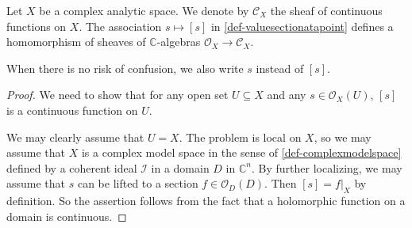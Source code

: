 \begin{lemma}
    Let $X$ be a complex analytic space. We denote by $\mathcal{C}_X$ the sheaf of continuous functions on $X$. 
    The association $s\mapsto [s]$ in \cref{def-valuesectionatapoint} defines a homomorphism of sheaves of $\mathbb{C}$-algebras $\mathcal{O}_X\rightarrow \mathcal{C}_X$. 
\end{lemma}
When there is no risk of confusion, we also write $s$ instead of $[s]$.
\begin{proof}
    We need to show that for any open set $U\subseteq X$ and any $s\in \mathcal{O}_X(U)$, $[s]$ is a continuous function on $U$. 
    
    We may clearly assume that $U=X$. The problem is local on $X$, so we may assume that $X$ is a complex model space in the sense of \cref{def-complexmodelspace} defined by a coherent ideal $\mathcal{I}$ in a domain $D$ in $\mathbb{C}^n$. By further localizing, we may assume that $s$ can be lifted to a section $f\in\mathcal{O}_D(D)$. Then $[s]=f|_X$ by definition. So the assertion follows from the fact that a holomorphic function on a domain is continuous.
\end{proof}

